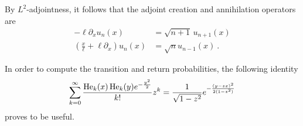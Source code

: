 \documentclass[%
 reprint,
superscriptaddress,
nofootinbib,
 amsmath,amssymb,
 aps,
prx,
]{revtex4-2}
\begin{document}
By $L^2$-adjointness, it follows that the adjoint creation and annihilation operators are
\begin{align}
	-\ell \partial_x u_{n}(x) &= \sqrt{n+1} \,u_{n+1}(x)  \label{eq:u_creation}\\
	\left(\frac{x}{\ell}+ \ell\partial_x\right) u_n(x) &= \sqrt{n} u_{n-1}(x) ~.
	\label{eq:u_annihilation}
\end{align}

In order to compute the transition and return probabilities, the following identity \cite{MagnusOberhettingerSoni:1966}
\begin{multline}
	\sum_{k = 0 }^{\infty} \frac{\operatorname{He}_k(x) \operatorname{He}_k(y)e^{-\frac{y^2}{2}}}{k!} z^k = \frac{1}{ \sqrt{ 1 - z^2}} e^{ -\frac{(y-zx)^2}{2(1-z^2)}}
	\label{eq:hermite_identity}
\end{multline}
proves to be useful.
\end{document}
